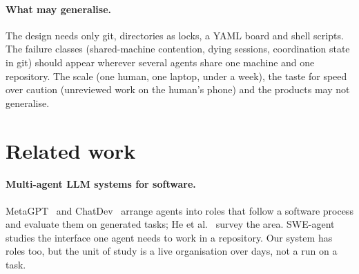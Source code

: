 \documentclass[11pt]{article}
\begin{document}
\paragraph{What may generalise.}
The design needs only git, directories as locks, a YAML board and shell scripts. The
failure classes (shared-machine contention, dying sessions, coordination state in git)
should appear wherever several agents share one machine and one repository. The scale
(one human, one laptop, under a week), the taste for speed over caution (unreviewed work
on the human's phone) and the products may not generalise.

\section{Related work}\label{sec:related}

\paragraph{Multi-agent LLM systems for software.}
MetaGPT~\citep{hong2023metagpt} and ChatDev~\citep{qian2024chatdev} arrange agents into
roles that follow a software process and evaluate them on generated tasks; He et
al.~\citep{he2024llmmas} survey the area. SWE-agent~\citep{yang2024sweagent} studies the
interface one agent needs to work in a repository. Our system has roles too, but the unit
of study is a live organisation over days, not a run on a task.
\end{document}
